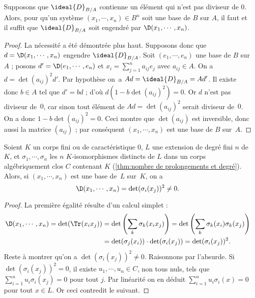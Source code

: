 \documentclass[11pt, useosf,
  title in boldface,
  theorem in new line,
  theorem numbering = section,
  number theorems separately,
]{simplivre}
\begin{document}
    \begin{proposition}
        Supposons que \( \ideal{D}_{B/A} \) contienne un élément qui n'est pas diviseur de \( 0 \). Alors, pour qu'un système \( (x_1, \cdots, x_n) \in B^n \) soit une base de \( B \) sur \( A \), il faut et il suffit que \( \ideal{D}_{B/A} \) soit engendré par \( \D(x_1, \cdots, x_n) \).
    \end{proposition}
    \begin{proof}
        La nécessité a été démontrée plus haut. Supposons donc que \( d = \D(x_1, \cdots, x_n) \) engendre \( \ideal{D}_{B/A} \). Soit \( (e_1, \cdots, e_n) \) une base de \( B \) sur \( A \) ; posons \( d' = \D(e_1, \cdots, e_n) \) et \( x_i = \sum_{j=1}^n a_{ij} e_j \) avec \( a_{ij} \in A \). On a \( d = \det(a_{ij})^2 d' \). Par hypothèse on~a \( Ad = \ideal{D}_{B/A} = Ad' \). Il existe donc \( b \in A \) tel que \( d' = bd \) ; d'où \( d(1-b \det(a_{ij})^2) = 0 \). Or \( d \) n'est pas diviseur de~\( 0 \), car sinon tout élément de \( Ad = \det(a_{ij})^2 \) serait diviseur de~\( 0 \). On a donc \( 1-b \det(a_{ij})^2 = 0 \). Ceci montre que \( \det(a_{ij}) \) est inversible, donc aussi la matrice \( (a_{ij}) \) ; par conséquent \( (x_1, \cdots, x_n) \) est une base de \( B \) sur~\( A \).
    \end{proof}

    \begin{proposition}\label{prop:disc et det;K-isomorphismes}
        Soient \( K \) un corps fini ou de caractéristique \( 0 \), \( L \) une extension de degré fini \( n \) de \( K \), et \( \sigma_1, \cdots, \sigma_n \) les \( n \) \( K \)‑isomorphismes distincts de \( L \) dans un corps algébriquement clos \( C \) contenant \( K \) (\cref{thm:nombre de prolongements et degré}). Alors, si \( (x_1, \cdots, x_n) \) est une base de~\( L \) sur~\( K \), on a
        \begin{equation}
            \D(x_1, \cdots, x_n) = \det(\sigma_i(x_j))^2 \neq 0.
        \end{equation}
    \end{proposition}
    \begin{proof}
        La première égalité résulte d'un calcul simplet :
        \begin{align*}
            \D(x_1, \cdots, x_n) = \det(\Tr(x_i x_j)) &= \det\left(\sum_k \sigma_k(x_i x_j)\right) = \det\left(\sum_k \sigma_k(x_i) \sigma_k(x_j)\right)\\
            &= \det(\sigma_j(x_i)) \cdot \det(\sigma_i(x_j)) = \det(\sigma_i(x_j))^2.
        \end{align*}
        Reste à montrer qu'on a \( \det(\sigma_i(x_j))^2 \neq 0 \). Raisonnons par l'absurde. Si \mbox{\( \det(\sigma_i(x_j))^2 = 0 \)}, il existe \( u_1, \cdots, u_n \in C \), non tous nuls, tels que \( \sum_{i=1}^n u_i \sigma_i (x_j) = 0 \) pour tout \( j \). Par linéarité on en déduit \( \sum_{i=1}^n u_i \sigma_i (x) = 0 \) pour tout \( x \in L \). Or ceci contredit le  suivant.
    \end{proof}
\end{document}

